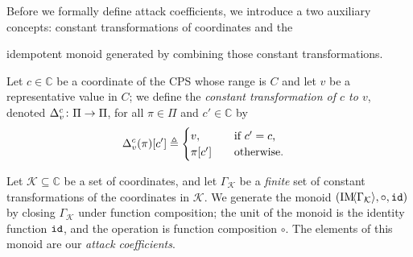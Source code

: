 {Before we formally define attack coefficients, we introduce a two auxiliary concepts: {constant transformations of coordinates} and the {idempotent monoid generated by combining those constant transformations.
\begin{definition}
  Let $c\in \mathbb{C}$ be a coordinate of the CPS whose range is $C$ and let $v$ be a representative value in $C$; we define the \emph{constant transformation of $c$ to $v$}, denoted ${\Delta}^{c}_{v}\colon \Pi\rightarrow \Pi$, for all $\pi \in \Pi$ and $c'\in \mathbb{C}$ by
  \begin{align}
    {\Delta}^{c}_{v}(\pi)[c']& \triangleq 
    \begin{cases}
     v, &\quad \text{if $c'=c$,}\\
     \pi[c']&\quad \text{otherwise.}
    \end{cases} 
  \end{align} 
\end{definition}

\begin{definition}
  \label{def:IdempotentMonoid}

Let $\mathcal{K}\subseteq\mathbb{C}$ be a set of coordinates, and let $\Gamma_\mathcal{K}$ be a \emph{finite} set of constant transformations of the coordinates in $\mathcal{K}$. We generate the monoid $(\text{IM}\!{{\left<\Gamma_{\mathcal{K}}\right>}},\circ,{\texttt{id}})$ %
by closing %
$\Gamma_{\mathcal{K}}$ under function composition; the unit of the monoid is the identity function ${\texttt{id}}$, and the operation is function composition $\circ$. The elements of this monoid are our \emph{attack coefficients}.


\end{definition}}}
